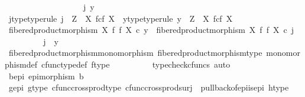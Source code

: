 \begin{isabellebody}
\ \ \ \ \ \ \isamarkupfalse%
\isanewline
\ \ \ \ \isamarkupfalse%
\isanewline
\ \ \ \ \ \ \isamarkupfalse%
\ j\ y\isanewline
\ \ \ \ \ \ \isamarkupfalse%
\ j{\isacharunderscore}{\kern0pt}type{\isacharbrackleft}{\kern0pt}type{\isacharunderscore}{\kern0pt}rule{\isacharbrackright}{\kern0pt}{\isacharcolon}{\kern0pt}\ {\isachardoublequoteopen}j\ {\isacharcolon}{\kern0pt}\ Z\ {\isasymrightarrow}\ X\ \isactrlbsub f\isactrlesub {\isasymtimes}\isactrlsub c\isactrlbsub f\isactrlesub \ X{\isachardoublequoteclose}\ \ y{\isacharunderscore}{\kern0pt}type{\isacharbrackleft}{\kern0pt}type{\isacharunderscore}{\kern0pt}rule{\isacharbrackright}{\kern0pt}{\isacharcolon}{\kern0pt}\ {\isachardoublequoteopen}y\ {\isacharcolon}{\kern0pt}\ Z\ {\isasymrightarrow}\ X\ \isactrlbsub f\isactrlesub {\isasymtimes}\isactrlsub c\isactrlbsub f\isactrlesub \ X{\isachardoublequoteclose}\isanewline
\ \ \ \ \ \ \isamarkupfalse%
\ {\isachardoublequoteopen}fibered{\isacharunderscore}{\kern0pt}product{\isacharunderscore}{\kern0pt}morphism\ X\ f\ f\ X\ {\isasymcirc}\isactrlsub c\ y\ {\isacharequal}{\kern0pt}\ fibered{\isacharunderscore}{\kern0pt}product{\isacharunderscore}{\kern0pt}morphism\ X\ f\ f\ X\ {\isasymcirc}\isactrlsub c\ j{\isachardoublequoteclose}\isanewline
\ \ \ \ \ \ \isamarkupfalse%
\ \isamarkupfalse%
\ {\isachardoublequoteopen}j\ {\isacharequal}{\kern0pt}\ y{\isachardoublequoteclose}\isanewline
\ \ \ \ \ \ \ \ \isamarkupfalse%
\ fibered{\isacharunderscore}{\kern0pt}product{\isacharunderscore}{\kern0pt}morphism{\isacharunderscore}{\kern0pt}monomorphism\ fibered{\isacharunderscore}{\kern0pt}product{\isacharunderscore}{\kern0pt}morphism{\isacharunderscore}{\kern0pt}type\ monomorphism{\isacharunderscore}{\kern0pt}def\ cfunc{\isacharunderscore}{\kern0pt}type{\isacharunderscore}{\kern0pt}def\ f{\isacharunderscore}{\kern0pt}type\isanewline
\ \ \ \ \ \ \ \ \isamarkupfalse%
\ {\isacharparenleft}{\kern0pt}typecheck{\isacharunderscore}{\kern0pt}cfuncs{\isacharcomma}{\kern0pt}\ auto{\isacharparenright}{\kern0pt}\isanewline
\ \ \ \ \isamarkupfalse%
\isanewline
\ \ \isamarkupfalse%
\isanewline
\ \ \isamarkupfalse%
\ \isamarkupfalse%
\ b{\isacharunderscore}{\kern0pt}epi{\isacharcolon}{\kern0pt}\ {\isachardoublequoteopen}epimorphism\ b{\isachardoublequoteclose}\isanewline
\ \ \ \ \isamarkupfalse%
\ g{\isacharunderscore}{\kern0pt}epi\ g{\isacharunderscore}{\kern0pt}type\ cfunc{\isacharunderscore}{\kern0pt}cross{\isacharunderscore}{\kern0pt}prod{\isacharunderscore}{\kern0pt}type\ cfunc{\isacharunderscore}{\kern0pt}cross{\isacharunderscore}{\kern0pt}prod{\isacharunderscore}{\kern0pt}surj\ \ pullback{\isacharunderscore}{\kern0pt}of{\isacharunderscore}{\kern0pt}epi{\isacharunderscore}{\kern0pt}is{\isacharunderscore}{\kern0pt}epi{}\ h{\isacharunderscore}{\kern0pt}type\isanewline

\end{isabellebody}
